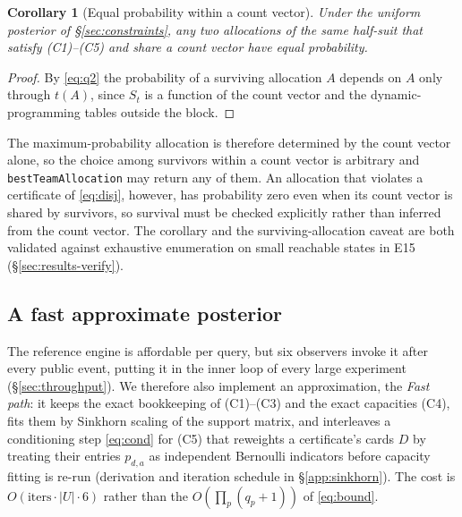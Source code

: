 \documentclass[11pt]{article}
\newtheorem{corollary}[theorem]{Corollary}
\theoremstyle{definition}
\begin{document}
\begin{corollary}[Equal probability within a count vector]
\label{cor:equalprob}
Under the uniform posterior of \S\ref{sec:constraints}, any two allocations of
the same half-suit that satisfy (C1)--(C5) and share a count vector have equal
probability.
\end{corollary}

\begin{proof}
By \eqref{eq:q2} the probability of a surviving allocation $A$ depends on $A$
only through $t(A)$, since $S_t$ is a function of the count vector and the
dynamic-programming tables outside the block.
\end{proof}

The maximum-probability allocation is therefore determined by the count vector
alone, so the choice among survivors within a count vector is arbitrary and
\texttt{bestTeamAllocation} may return any of them. An allocation that
violates a certificate of \eqref{eq:disj}, however, has probability zero even
when its count vector is shared by survivors, so survival must be checked
explicitly rather than inferred from the count vector. The corollary and the
surviving-allocation caveat are both validated against exhaustive enumeration
on small reachable states in E15 (\S\ref{sec:results-verify}).

\subsection{A fast approximate posterior}
\label{sec:fast}

The reference engine is affordable per query, but six observers invoke it
after every public event, putting it in the inner loop of every large
experiment (\S\ref{sec:throughput}). We therefore also implement an
approximation, the \emph{Fast path}: it keeps the exact bookkeeping of
(C1)--(C3) and the exact capacities (C4), fits them by Sinkhorn scaling of the
support matrix, and interleaves a conditioning step \eqref{eq:cond} for (C5)
that reweights a certificate's cards $D$ by treating their entries $p_{d,a}$
as independent Bernoulli indicators before capacity fitting is re-run
(derivation and iteration schedule in \S\ref{app:sinkhorn}). The cost is
$O(\text{iters} \cdot |U| \cdot 6)$ rather than the $O(\prod_p (q_p+1))$ of
\eqref{eq:bound}.
\end{document}
